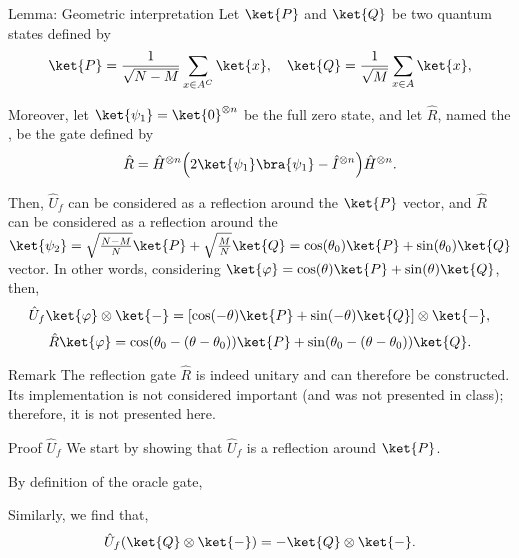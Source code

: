 \documentclass[a4paper]{article}
\begin{document}
\begin{parag}{Lemma: Geometric interpretation}
    Let $\ket{P}$ and $\ket{Q}$ be two quantum states defined by
    \[\ket{P} = \frac{1}{\sqrt{N-M}} \sum_{x \in A^C} \ket{x}, \mathspace \ket{Q} = \frac{1}{\sqrt{M}} \sum_{x \in A} \ket{x},\]

    Moreover, let $\ket{\psi_1} = \ket{0}^{\otimes n}$ be the full zero state, and let $\hat{R}$, named the , be the gate defined by 
    \[\hat{R} = \hat{H}^{\otimes n} \left(2 \ket{\psi_1}\bra{\psi_1} - \hat{I}^{\otimes n}\right) \hat{H}^{\otimes n}.\]

    Then, $\hat{U}_f$ can be considered as a reflection around the $\ket{P}$ vector, and $\hat{R}$ can be considered as a reflection around the $\ket{\psi_2} = \sqrt{\frac{N-M}{N}} \ket{P} + \sqrt{\frac{M}{N}} \ket{Q} = \cos\left(\theta_0\right) \ket{P} + \sin\left(\theta_0\right) \ket{Q}$ vector. In other words, considering $\ket{\phi} = \cos\left(\theta\right) \ket{P} + \sin\left(\theta\right) \ket{Q}$, then, 
    \[\hat{U}_f \ket{\phi} \otimes \ket{-} = \left[\cos\left(-\theta\right) \ket{P} + \sin\left(-\theta\right) \ket{Q}\right] \otimes \ket{-},\]
    \[\hat{R} \ket{\phi} = \cos\left(\theta_0 - \left(\theta - \theta_0\right)\right) \ket{P} + \sin\left(\theta_0 - \left(\theta - \theta_0\right)\right)\ket{Q}.\]


    \begin{subparag}{Remark}
        The reflection gate $\hat{R}$ is indeed unitary and can therefore be constructed. Its implementation is not considered important (and was not presented in class); therefore, it is not presented here.
    \end{subparag}

    \begin{subparag}{Proof $\hat{U}_f$}
        We start by showing that $\hat{U}_f$ is a reflection around $\ket{P}$.

        By definition of the oracle gate, 
        
        Similarly, we find that, 
        \[\hat{U}_f \left(\ket{Q} \otimes \ket{-}\right) = -\ket{Q} \otimes \ket{-}.\]


\end{subparag}
\end{parag}
\end{document}
